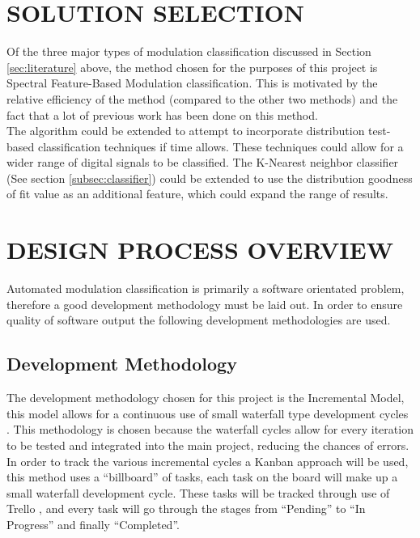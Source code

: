 \documentclass[10pt,twocolumn]{witseiepaper}
\begin{document}
\section{SOLUTION SELECTION}
Of the three major types of modulation classification discussed in Section \ref{sec:literature} above, the method chosen for the purposes of this project is Spectral Feature-Based Modulation classification. This is motivated by the relative efficiency of the method (compared to the other two methods) \cite{zhu2014automatic} and the fact that a lot of previous work has been done on this method.\\[10pt]
The algorithm could be extended to attempt to incorporate distribution test-based classification techniques if time allows. These techniques could allow for a wider range of digital signals to be classified. The K-Nearest neighbor classifier (See section \ref{subsec:classifier}) could be extended to use the distribution goodness of fit value as an additional feature, which could expand the range of results.

\section{DESIGN PROCESS OVERVIEW}
	Automated modulation classification is primarily a software orientated problem, therefore a good development methodology must be laid out. In order to ensure quality of software output the following development methodologies are used.
	\subsection{Development Methodology}
	\label{subsec:devmethod}
	The development methodology chosen for this project is the Incremental Model, this model allows for a continuous use of small waterfall type development cycles \cite{incremental_model}. This methodology is chosen because the waterfall cycles allow for every iteration to be tested and integrated into the main project, reducing the chances of errors. \\[10pt]
	In order to track the various incremental cycles a Kanban approach \cite{kanban_model} will be used, this method uses a ``billboard'' of tasks, each task on the board will make up a small waterfall development cycle. These tasks will be tracked through use of Trello \cite{trello}, and every task will go through the stages from ``Pending'' to ``In Progress'' and finally ``Completed''.	
	
\end{document}
